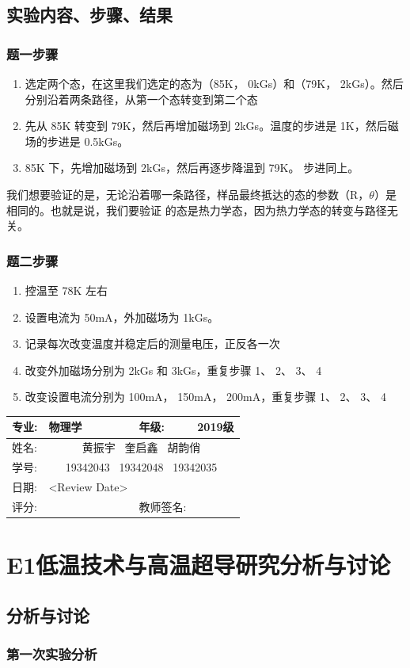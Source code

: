 \documentclass{ctexart}
\newcommand{\experimentname}{E1低温技术与高温超导研究}
\newcommand{\student}{黄振宇  \ 奎启鑫 \ 胡韵俏}
\newcommand{\Grade}{2019级}
\newcommand{\stuID}{19342043  \ 19342048 \ 19342035}
\newcommand{\reviewdate}{<Review Date>}
\theoremstyle{ansstyle}
\newcommand{\reviewdata}{%
	\begin{center}
		\begin{tabular}{|p{2cm}|p{4cm}|p{4cm}|p{4cm}|}
			\hline
			专业: & 物理学 & 年级:  & \Grade \\
			\hline
			姓名:  & \multicolumn{3}{c|}{\student} \\
			\hline 
			学号:  & \multicolumn{3}{c|}{\stuID} \\
			\hline
			日期: & \reviewdate & & \\
			\hline
			评分: & & 教师签名: & \\
			\hline
		\end{tabular}
	\end{center}%
}
\begin{document}
\subsection{实验内容、步骤、结果}
\subsubsection{题一步骤}
\begin{enumerate}
	\item 选定两个态，在这里我们选定的态为（85K， 0kGs）和（79K， 2kGs）。然后分别沿着两条路径，从第一个态转变到第二个态
	\item 先从 85K 转变到 79K，然后再增加磁场到 2kGs。温度的步进是 1K，然后磁场的步进是 0.5kGs。
	\item  85K 下，先增加磁场到 2kGs，然后再逐步降温到 79K。 步进同上。
\end{enumerate}
我们想要验证的是，无论沿着哪一条路径，样品最终抵达的态的参数（R，$\theta$）是相同的。也就是说，我们要验证
的态是热力学态，因为热力学态的转变与路径无关。
\subsubsection{题二步骤}
\begin{enumerate}
	\item 控温至 78K 左右
	\item 设置电流为 50mA，外加磁场为 1kGs。
	\item  记录每次改变温度并稳定后的测量电压，正反各一次
	\item 改变外加磁场分别为 2kGs 和 3kGs，重复步骤 1、 2、 3、 4
	\item 改变设置电流分别为 100mA， 150mA， 200mA，重复步骤 1、 2、 3、 4
\end{enumerate}

\newpage


\reviewdata

\section*{\experimentname 分析与讨论}


\subsection{分析与讨论}
\subsubsection{第一次实验分析}
\end{document}
